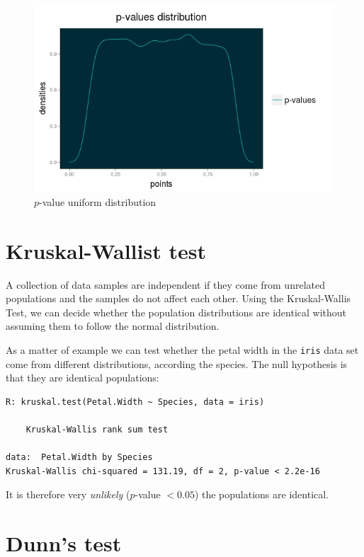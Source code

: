 \begin{figure}[htbp]
 \centering
 \includegraphics[scale=.6]{images/p_value_distr}
 \caption*{$p$-value uniform distribution}
\end{figure}

\section{Kruskal-Wallist test}
A collection of data samples are independent 
if they come from unrelated populations and 
the samples do not affect each other. Using the 
Kruskal-Wallis Test, we can decide whether the 
population distributions are identical without 
assuming them to follow the normal distribution.
\bigskip 

As a matter of example we can test 
whether the petal width in the \texttt{iris}
data set come from different distributions,
according the species. The null hypothesis 
is that they are identical populations:
\begin{verbatim}
R: kruskal.test(Petal.Width ~ Species, data = iris)

	Kruskal-Wallis rank sum test

data:  Petal.Width by Species
Kruskal-Wallis chi-squared = 131.19, df = 2, p-value < 2.2e-16
\end{verbatim}
It is therefore very \emph{unlikely} ($p$-value $<0.05$) 
the populations are identical.

\section{Dunn's test}

